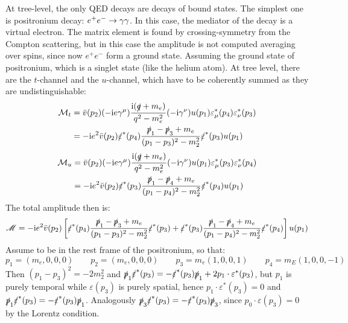 At tree-level, the only QED decays are decays of bound states. The simplest one is positronium decay: $ e^+ e^- \rightarrow \gamma \gamma $. In this case, the mediator of the decay is a virtual electron. The matrix element is found by crossing-symmetry from the Compton scattering, but in this case the amplitude is not computed averaging over spins, since now $ e^+ e^- $ form a ground state. Assuming the ground state of positronium, which is a singlet state (like the helium atom). At tree level, there are the $ t $-channel and the $ u $-channel, which have to be coherently summed as they are undistinguishable:
\begin{equation*}
  \begin{split}
    \mathcal{M}_t
    & = \bar{v}(p_2) (-\mathrm{i} e \gamma^\mu) \frac{\mathrm{i}(\slashed{q} + m_e)}{q^2 - m_e^2} (-\mathrm{i} \gamma^\nu) u(p_1) \varepsilon_\mu^*(p_4) \varepsilon_\nu^*(p_3) \\
    & = - \mathrm{i} e^2 \bar{v}(p_2) \slashed{\varepsilon}^*(p_4) \frac{\slashed{p}_1 - \slashed{p}_3 + m_e}{(p_1 - p_3)^2 - m_2^2} \slashed{\varepsilon}^*(p_3) u(p_1)
  \end{split}
\end{equation*}
\begin{equation*}
  \begin{split}
    \mathcal{M}_u
    & = \bar{v}(p_2) (-\mathrm{i} e \gamma^\mu) \frac{\mathrm{i}(\slashed{q} + m_e)}{q^2 - m_e^2} (-\mathrm{i} \gamma^\nu) u(p_1) \varepsilon_\mu^*(p_3) \varepsilon_\nu^*(p_4) \\
    & = - \mathrm{i} e^2 \bar{v}(p_2) \slashed{\varepsilon}^*(p_3) \frac{\slashed{p}_1 - \slashed{p}_4 + m_e}{(p_1 - p_4)^2 - m_2^2} \slashed{\varepsilon}^*(p_4) u(p_1)
  \end{split}
\end{equation*}
The total amplitude then is:
\begin{equation*}
  \mathscr{M} = - \mathrm{i} e^2 \bar{v}(p_2) \left[ \slashed{\varepsilon}^*(p_4)  \frac{\slashed{p}_1 - \slashed{p}_3 + m_e}{(p_1 - p_3)^2 - m_2^2} \slashed{\varepsilon}^*(p_3) + \slashed{\varepsilon}^*(p_3) \frac{\slashed{p}_1 - \slashed{p}_4 + m_e}{(p_1 - p_4)^2 - m_2^2} \slashed{\varepsilon}^*(p_4) \right] u(p_1)
\end{equation*}
Assume to be in the rest frame of the positronium, so that:
\begin{equation*}
  p_1 = (m_e,0,0,0)
  \qquad p_2 = (m_e,0,0,0)
  \qquad p_3 = m_e (1,0,0,1)
  \qquad p_4 = m_E (1,0,0,-1)
\end{equation*}
Then $ (p_1 - p_3)^2 = - 2 m_2^2 $ and $ \slashed{p}_1 \slashed{\varepsilon}^*(p_3) = - \slashed{\varepsilon}^*(p_3) \slashed{p}_1 + 2 p_1 \cdot \varepsilon^*(p_3) $, but $ p_1 $ is purely temporal while $ \varepsilon(p_3) $ is purely spatial, hence $ p_1 \cdot \varepsilon^*(p_3) = 0 $ and $ \slashed{p}_1 \slashed{\varepsilon}^*(p_3) = - \slashed{\varepsilon}^*(p_3) \slashed{p}_1 $. Analogously $ \slashed{p}_3 \slashed{\varepsilon}^*(p_3) = - \slashed{\varepsilon}^*(p_3) \slashed{p}_3 $, since $ p_0 \cdot \varepsilon(p_3) = 0 $ by the Lorentz condition.










